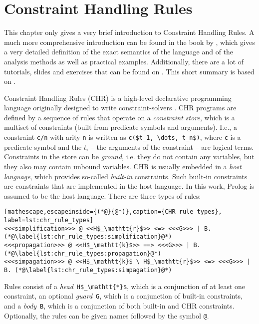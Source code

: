 \chapter{Constraint Handling Rules}
\label{chr_introduction}

This chapter only gives a very brief introduction to Constraint Handling Rules. A much more comprehensive introduction can be found in the book  by \citeauthor{fru_chr_book_2009} \cite{fru_chr_book_2009}, which gives a very detailed definition of the exact semantics of the language and of the analysis methods as well as practical examples. Additionally, there are a lot of tutorials, slides and exercises that can be found on  \cite{chr_homepage}. This short summary is based on \cite{fru_chr_book_2009}.

Constraint Handling Rules (CHR) is a high-level declarative programming language originally designed to write constraint-solvers \cite[2]{chr_survey_tplp10}. CHR programs are defined by a sequence of rules that operate on a \emph{constraint store}, which is a multiset of constraints (built from predicate symbols and arguments). I.e., a constraint \lstinline|c/n| with arity \lstinline|n| is written as \lstinline[mathescape]|c($t_1, \dots, t_n$)|, where \lstinline|c| is a predicate symbol and the $t_i$ -- the arguments of the constraint -- are logical terms. Constraints in the store can be \emph{ground}, i.e. they do not contain any variables, but they also may contain unbound variables. CHR is usually embedded in a \emph{host language}, which provides so-called \emph{built-in} constraints. Such built-in constraints are constraints that are implemented in the host language. In this work, Prolog is assumed to be the host language. There are three types of rules:

\begin{lstlisting}[mathescape,escapeinside={(*@}{@*)},caption={CHR rule types}, label=lst:chr_rule_types]
<<<simplification>>> @ <<H$_\mathtt{r}$>> <=> <<<G>>> | B. (*@\label{lst:chr_rule_types:simplification}@*)
<<<propagation>>> @ <<H$_\mathtt{k}$>> ==> <<<G>>> | B. (*@\label{lst:chr_rule_types:propagation}@*)
<<<simpagation>>> @ <<H$_\mathtt{k}$ \ H$_\mathtt{r}$>> <=> <<<G>>> | B. (*@\label{lst:chr_rule_types:simpagation}@*)
\end{lstlisting}

Rules consist of a \emph{head}~\lstinline[mathescape]|H$_\mathtt{*}$|, which is a conjunction of at least one constraint, an optional \emph{guard}~\lstinline|G|, which is a conjunction of built-in constraints, and a \emph{body}~\lstinline|B|, which is a conjunction of both built-in and CHR constraints. Optionally, the rules can be given names followed by the symbol \lstinline|@|.

